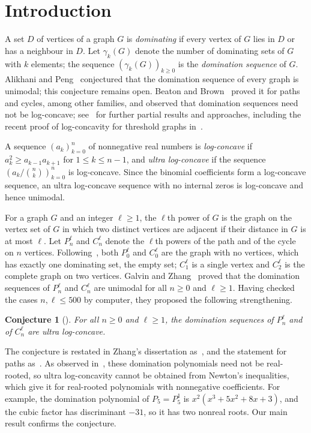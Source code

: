 \documentclass{amsart}
\newtheorem{conjecture}[theorem]{Conjecture}
\theoremstyle{definition}
\theoremstyle{remark}
\numberwithin{equation}{section}
\begin{document}
\section{Introduction}

A set $D$ of vertices of a graph $G$ is \emph{dominating} if every vertex of $G$ lies in $D$ or has a neighbour in $D$. Let $\gamma_k(G)$ denote the number of dominating sets of $G$ with $k$ elements; the sequence $(\gamma_k(G))_{k\ge0}$ is the \emph{domination sequence} of $G$. Alikhani and Peng~\cite{AP} conjectured that the domination sequence of every graph is unimodal; this conjecture remains open. Beaton and Brown~\cite{BB} proved it for paths and cycles, among other families, and observed that domination sequences need not be log-concave; see~\cite{GZ, O} for further partial results and approaches, including the recent proof of log-concavity for threshold graphs in~\cite{O}.

A sequence $(a_k)_{k=0}^n$ of nonnegative real numbers is \emph{log-concave} if $a_k^2\ge a_{k-1}a_{k+1}$ for $1\le k\le n-1$, and \emph{ultra log-concave} if the sequence $(a_k/\binom nk)_{k=0}^n$ is log-concave. Since the binomial coefficients form a log-concave sequence, an ultra log-concave sequence with no internal zeros is log-concave and hence unimodal.

For a graph $G$ and an integer $\ell\ge1$, the $\ell$th power of $G$ is the graph on the vertex set of $G$ in which two distinct vertices are adjacent if their distance in $G$ is at most $\ell$. Let $P_n^\ell$ and $C_n^\ell$ denote the $\ell$th powers of the path and of the cycle on $n$ vertices. Following~\cite{GZ}, both $P_0^\ell$ and $C_0^\ell$ are the graph with no vertices, which has exactly one dominating set, the empty set; $C_1^\ell$ is a single vertex and $C_2^\ell$ is the complete graph on two vertices. Galvin and Zhang~\cite[Theorem~1.4]{GZ} proved that the domination sequences of $P_n^\ell$ and $C_n^\ell$ are unimodal for all $n\ge0$ and $\ell\ge1$. Having checked the cases $n,\ell\le500$ by computer, they proposed the following strengthening.

\begin{conjecture}[{\cite[Conjecture~1.8]{GZ}}]\label{conj:GZ}
For all $n\ge0$ and $\ell\ge1$, the domination sequences of $P_n^\ell$ and of $C_n^\ell$ are ultra log-concave.
\end{conjecture}

The conjecture is restated in Zhang's dissertation as~\cite[Conjecture~4.1.8]{Z}, and the statement for paths as~\cite[Conjecture~5.1.1]{Z}. As observed in~\cite[p.~73]{Z}, these domination polynomials need not be real-rooted, so ultra log-concavity cannot be obtained from Newton's inequalities, which give it for real-rooted polynomials with nonnegative coefficients. For example, the domination polynomial of $P_5=P_5^1$ is $x^2(x^3+5x^2+8x+3)$, and the cubic factor has discriminant $-31$, so it has two nonreal roots. Our main result confirms the conjecture.
\end{document}
